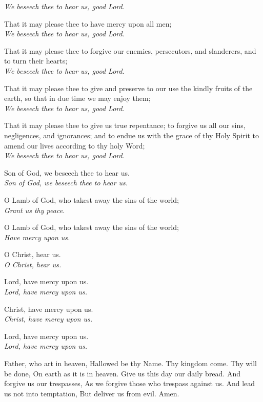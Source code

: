     \textit{We beseech thee to hear us, good Lord.}
    \par
    That it may please thee to have mercy upon all men;\\
    \textit{We beseech thee to hear us, good Lord.}
    \par
    That it may please thee to forgive our enemies, persecutors, and slanderers, and to turn their hearts;\\
    \textit{We beseech thee to hear us, good Lord.}
    \par
    That it may please thee to give and preserve to our use the kindly fruits of the earth, so that in due time we may enjoy them;\\
    \textit{We beseech thee to hear us, good Lord.}
    \par
    That it may please thee to give us true repentance; to forgive us all our sins, negligences, and ignorances; and to endue us with the grace of thy Holy Spirit to amend our lives according to thy holy Word;\\
    \textit{We beseech thee to hear us, good Lord.}
    \par
    Son of God, we beseech thee to hear us.\\
    \textit{Son of God, we beseech thee to hear us.}
    \par
    O Lamb of God, who takest away the sins of the world;\\
    \textit{Grant us thy peace.}
    \par
    O Lamb of God, who takest away the sins of the world;\\
    \textit{Have mercy upon us.}
    \par
    O Christ, hear us.\\
    \textit{O Christ, hear us.}
    \par
    Lord, have mercy upon us.\\
    \textit{Lord, have mercy upon us.}
    \par
    Christ, have mercy upon us.\\
    \textit{Christ, have mercy upon us.}
    \par
    Lord, have mercy upon us.\\
    \textit{Lord, have mercy upon us.}
    \par
{}
 Father, who art in heaven, Hallowed be thy Name. Thy kingdom come. Thy will be done, On earth as it is in heaven. Give us this day our daily bread. And forgive us our trespasses, As we forgive those who trespass against us. And lead us not into temptation, But deliver us from evil. Amen.
